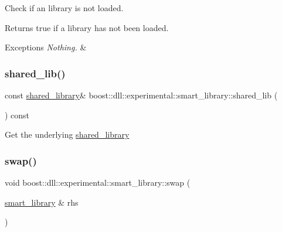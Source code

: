 Check if an library is not loaded.

\begin{DoxyReturn}{Returns}
true if a library has not been loaded. 
\end{DoxyReturn}

\begin{DoxyExceptions}{Exceptions}
{\em Nothing.} & \\
\hline
\end{DoxyExceptions}
\mbox{\label{a01712_a83948260b41f1b64cd1227da53954862}} 
\subsubsection{\texorpdfstring{shared\+\_\+lib()}{shared\_lib()}}
{\footnotesize\ttfamily const \hyperlink{a01708}{shared\+\_\+library}\& boost\+::dll\+::experimental\+::smart\+\_\+library\+::shared\+\_\+lib (\begin{DoxyParamCaption}{ }\end{DoxyParamCaption}) const\hspace{0.3cm}{\ttfamily [inline]}}

Get the underlying \hyperlink{a01708}{shared\+\_\+library} \mbox{\label{a01712_a437a1b5c2f71728147fcda529b553051}} 
\subsubsection{\texorpdfstring{swap()}{swap()}}
{\footnotesize\ttfamily void boost\+::dll\+::experimental\+::smart\+\_\+library\+::swap (\begin{DoxyParamCaption}\item[{\hyperlink{a01712}{smart\+\_\+library} \&}]{rhs }\end{DoxyParamCaption})\hspace{0.3cm}{\ttfamily [inline]}}





